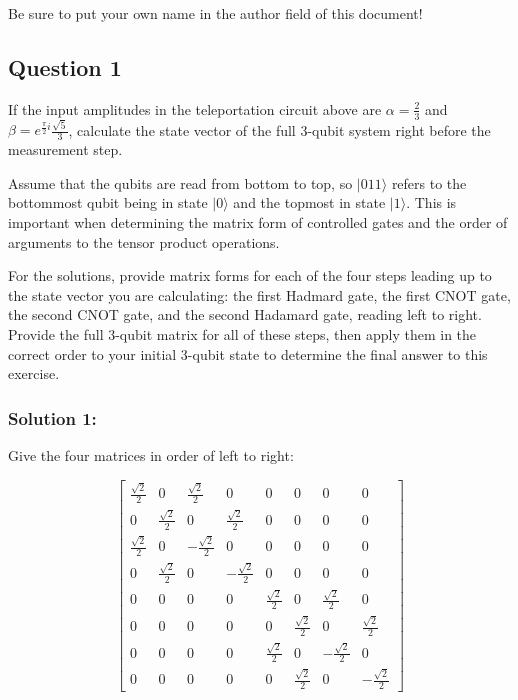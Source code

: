 \documentclass{article}
\begin{document}
Be sure to put your own name in the author field of this document!


\subsection*{Question 1}

If the input amplitudes in the teleportation circuit above are $\alpha = \frac{2}{3}$  
and $\beta=e^{\frac{\pi}{2}i} \frac{\sqrt{5}}{3}$, 
calculate the state vector of the full 3-qubit system right before the measurement step.

Assume that the qubits are read from bottom to top, so $|011\rangle$ refers to the bottommost
qubit being in state $|0\rangle$ and the topmost in state $|1\rangle$. This is important when
determining the matrix form of controlled gates and the order of arguments to the 
tensor product operations. 

For the solutions, provide matrix forms for each of the four steps leading up to the state vector 
you are calculating: the first Hadmard gate, the first CNOT gate, the second CNOT gate, and the second 
Hadamard gate, reading left to right. Provide the full 3-qubit matrix for all of these steps, then 
apply them in the correct order to your initial 3-qubit state to determine the final answer to this 
exercise.

\subsubsection*{Solution 1:}

Give the four matrices in order of left to right:

\vspace{5mm}

\[\displaystyle \begin{bmatrix}\frac{\sqrt{2}}{2} & 0 & \frac{\sqrt{2}}{2} & 0 & 0 & 0 & 0 & 0\\0 & \frac{\sqrt{2}}{2} & 0 & \frac{\sqrt{2}}{2} & 0 & 0 & 0 & 0\\\frac{\sqrt{2}}{2} & 0 & - \frac{\sqrt{2}}{2} & 0 & 0 & 0 & 0 & 0\\0 & \frac{\sqrt{2}}{2} & 0 & - \frac{\sqrt{2}}{2} & 0 & 0 & 0 & 0\\0 & 0 & 0 & 0 & \frac{\sqrt{2}}{2} & 0 & \frac{\sqrt{2}}{2} & 0\\0 & 0 & 0 & 0 & 0 & \frac{\sqrt{2}}{2} & 0 & \frac{\sqrt{2}}{2}\\0 & 0 & 0 & 0 & \frac{\sqrt{2}}{2} & 0 & - \frac{\sqrt{2}}{2} & 0\\0 & 0 & 0 & 0 & 0 & \frac{\sqrt{2}}{2} & 0 & - \frac{\sqrt{2}}{2}\end{bmatrix}\]
\end{document}
